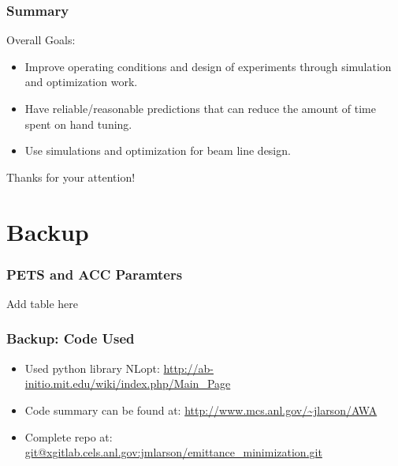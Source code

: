 \documentclass[professionalfonts,t]{beamer}
\begin{document}
\begin{frame}
\frametitle{Summary}
Overall Goals: 
\begin{itemize}
	\item Improve operating conditions and design of experiments through simulation and optimization work.
	\item Have reliable/reasonable predictions that can reduce the amount of time spent on hand tuning.
	\item Use simulations and optimization for beam line design.
\end{itemize}

\vspace{1em}
\centering
\color{blue}\huge{Thanks for your attention!}

\end{frame}



\section{Backup}
\begin{frame}
	\frametitle{PETS and ACC Paramters}
	Add table here
\end{frame}


\begin{frame}
\frametitle{Backup: Code Used}
\begin{itemize}
	\setlength\itemsep{2em}
	\item Used python library NLopt: \url{http://ab-initio.mit.edu/wiki/index.php/Main_Page}
	
	\item Code summary can be found at: \url{http://www.mcs.anl.gov/~jlarson/AWA}
	
	\item Complete repo at: \url{git@xgitlab.cels.anl.gov:jmlarson/emittance_minimization.git}
\end{itemize}	
\end{frame}
\end{document}
